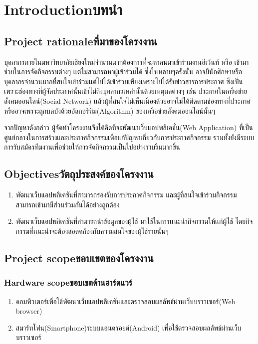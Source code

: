 \chapter{\ifenglish Introduction\else บทนำ\fi}

\section{\ifenglish Project rationale\else ที่มาของโครงงาน\fi}
บุคลากรภายในมหาวิทยาลัยเชียงใหม่จำนวนมากต้องการที่จะหาคนมาเข้าร่วมงานอีเว้นท์ หรือ เข้ามาช่วยในการจัดกิจกรรมต่างๆ เเต่ไม่สามารถหาผู้เข้าร่วมได้ ซึ่งในหลายๆครั้งนั้น อาจมีนักศึกษาหรือบุคลากรจำนวนมากที่สนใจเข้าร่วมเเต่ไม่ได้เข้าร่วมเพียงเพราะไม่ได้รับข่าวสารการประกาศ ซึ่งเป็นเพราะช่องทางที่ผู้จัดประกาศนั้นเข้าไม่ถึงบุคลากรเหล่านั้นด้วยเหตุผลต่างๆ เช่น ประกาศในเครือข่ายสังคมออนไลน์(Social Network) เเล้วผู้ที่สนใจไม่เห็นเนื่องด้วยอาจไม่ได้ติดตามช่องทางที่ประกาศหรืออาจเพราะถูกบดบังด้วยอัลกอริทึม(Algorithm) ของเครือข่ายสังคมออนไลน์นั้นๆ

จากปัญหาดังกล่าว ผู้จัดทำโครงงานจึงได้คิดที่จะพัฒนาเว็บแอปพลิเคชั่น(Web Application) ที่เป็นศูนย์กลางในการสร้างและประกาศกิจกรรมเพื่อแก้ปัญหาเกี่ยวกับการประกาศกิจกรรม รวมทั้งยังมีระบบการรับสมัครทีมงานเพื่อช่วยให้การจัดกิจกรรมเป็นไปอย่างราบรื่นมากขึ้น


\section{\ifenglish Objectives\else วัตถุประสงค์ของโครงงาน\fi}
\begin{enumerate}
    \item พัฒนาเว็บแอปพลิเคชันที่สามารถรองรับการประกาศกิจกรรม และผู้ที่สนใจเข้าร่วมกิจกรรมสามารถเข้ามามีส่วนร่วมกันได้อย่างถูกต้อง
    \item พัฒนาเว็บแอปพลิเคชันที่สามารถนำข้อมูลของผู้ใช้ มาใช้ในการเเนะนำกิจกรรมให้เเก่ผู้ใช้ โดยกิจกรรมที่เเนะนำจะต้องสอดคล้องกับความสนใจของผู้ใช้รายนั้นๆ
\end{enumerate}

\section{\ifenglish Project scope\else ขอบเขตของโครงงาน\fi}

\subsection{\ifenglish Hardware scope\else ขอบเขตด้านฮาร์ดแวร์\fi}
\begin{enumerate}
    \item คอมพิวเตอร์เพื่อใช้พัฒนาเว็บแอปพลิเคชันและตรวจสอบผลลัพธ์ผ่านเว็บบราวเซอร์(Web browser)
    \item สมาร์ทโฟน(Smartphone)ระบบแอนดรอยด์(Android) เพื่อใช้ตรวจสอบผลลัพธ์ผ่านเว็บบราวเซอร์
\end{enumerate}

